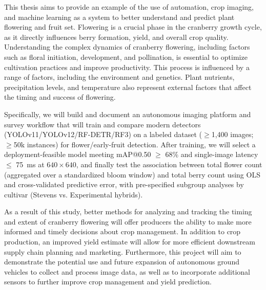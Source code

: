 This thesis aims to provide an example of the use of automation, crop imaging, and machine learning as a system to better understand and predict plant flowering and fruit set. Flowering is a crucial phase in the cranberry growth cycle, as it directly influences berry formation, yield, and overall crop quality. Understanding the complex dynamics of cranberry flowering, including factors such as floral initiation, development, and pollination, is essential to optimize cultivation practices and improve productivity.  This process is influenced by a range of factors, including the environment and genetics. Plant nutrients, precipitation levels, and temperature also represent external factors that affect the timing and success of flowering.

Specifically, we will build and document an autonomous imaging platform and survey workflow that will train and compare modern detectors (YOLOv11/YOLOv12/RF-DETR/RF3) on a labeled dataset ($\geq$1,400 images; $\geq$50k instances) for flower/early-fruit detection. After training, we will select a deployment-feasible model meeting mAP@0.50 $\geq$ 68\% and single-image latency $\leq$ 75~ms at $640 \times 640$, and finally test the association between total flower count (aggregated over a standardized bloom window) and total berry count using OLS and cross-validated predictive error, with pre-specified subgroup analyses by cultivar (Stevens vs. Experimental hybrids).

As a result of this study, better methods for analyzing and tracking the timing and extent of cranberry flowering will offer producers the ability to make more informed and timely decisions about crop management. In addition to crop production, an improved yield estimate will allow for more efficient downstream supply chain planning and marketing. Furthermore, this project will aim to demonstrate the potential use and future expansion of autonomous ground vehicles to collect and process image data, as well as to incorporate additional sensors to further improve crop management and yield prediction.
